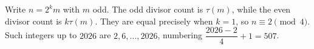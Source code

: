 Write $n=2^km$ with $m$ odd. The odd divisor count is $\tau(m)$, while the even divisor count is $k\tau(m)$. They are equal precisely when $k=1$, so $n\equiv 2\pmod 4$. Such integers up to $2026$ are $2,6,\ldots,2026$, numbering $\dfrac{2026-2}{4}+1=\boxed{507}$.

